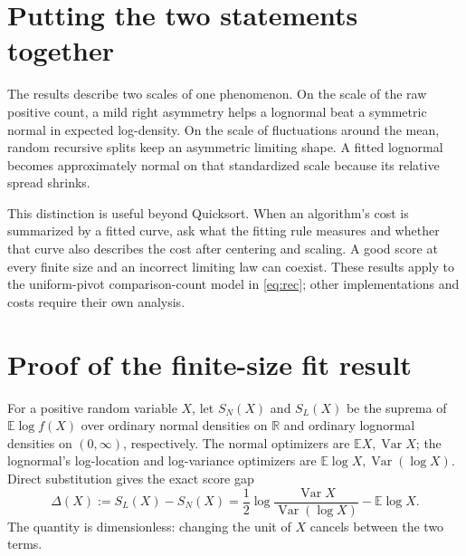 \documentclass[10pt,letterpaper]{article}
\newcommand{\E}{\mathbb E}
\newcommand{\Var}{\operatorname{Var}}
\begin{document}
\FloatBarrier
\section{Putting the two statements together}
The results describe two scales of one phenomenon. On the scale of the raw positive count, a mild right asymmetry helps a lognormal beat a symmetric normal in expected log-density. On the scale of fluctuations around the mean, random recursive splits keep an asymmetric limiting shape. A fitted lognormal becomes approximately normal on that standardized scale because its relative spread shrinks.

This distinction is useful beyond Quicksort. When an algorithm's cost is summarized by a fitted curve, ask what the fitting rule measures and whether that curve also describes the cost after centering and scaling. A good score at every finite size and an incorrect limiting law can coexist. These results apply to the uniform-pivot comparison-count model in \eqref{eq:rec}; other implementations and costs require their own analysis.

\appendix
\renewcommand{\thesection}{Appendix \Alph{section}}
\section{Proof of the finite-size fit result}
For a positive random variable $X$, let $S_N(X)$ and $S_L(X)$ be the suprema of $\E\log f(X)$ over ordinary normal densities on $\mathbb R$ and ordinary lognormal densities on $(0,\infty)$, respectively. The normal optimizers are $\E X,\Var X$; the lognormal's log-location and log-variance optimizers are $\E\log X,\Var(\log X)$. Direct substitution gives the exact score gap
\begin{equation}
\Delta(X):=S_L(X)-S_N(X)
=\frac12\log\frac{\Var X}{\Var(\log X)}-\E\log X.       \label{eq:gap}
\end{equation}
The quantity is dimensionless: changing the unit of $X$ cancels between the two terms.
\end{document}

